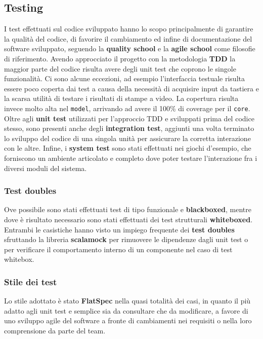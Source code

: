 \subsection{Testing}
I test effettuati sul codice sviluppato hanno lo scopo principalmente di garantire la qualità del codice, di favorire il cambiamento ed infine di documentazione del software sviluppato, seguendo la \textbf{quality school} e la \textbf{agile school} come filosofie di riferimento.
%
Avendo approcciato il progetto con la metodologia \textbf{TDD} la maggior parte del codice risulta avere degli unit test che coprono le singole funzionalità.
%
Ci sono alcune eccezioni, ad esempio l'interfaccia testuale risulta essere poco coperta dai test a causa della necessità di acquisire input da tastiera e la scarsa utilità di testare i risultati di stampe a video.
%
La copertura risulta invece molto alta nel \texttt{model}, arrivando ad avere il 100\% di coverage per il \texttt{core}.
%
Oltre agli \textbf{unit test} utilizzati per l'approccio TDD e sviluppati prima del codice stesso, sono presenti anche degli \textbf{integration test}, aggiunti una volta terminato lo sviluppo del codice di una singola unità per assicurare la corretta interazione con le altre.
%
Infine, i \textbf{system test} sono stati effettuati nei giochi d'esempio, che forniscono un ambiente articolato e completo dove poter testare l'interazione fra i diversi moduli del sistema.
%

\subsubsection{Test doubles}
Ove possibile sono stati effettuati test di tipo funzionale e \textbf{blackboxed}, mentre dove è risultato necessario sono stati effettuati dei test strutturali \textbf{whiteboxed}.
%
Entrambi le casistiche hanno visto un impiego frequente dei \textbf{test doubles} sfruttando la libreria \textbf{scalamock} per rimuovere le dipendenze dagli unit test o per verificare il comportamento interno di un componente nel caso di test whitebox.

\subsubsection{Stile dei test}
Lo stile adottato è stato \textbf{FlatSpec} nella quasi totalità dei casi, in quanto il più adatto agli unit test e semplice sia da consultare che da modificare, a favore di uno sviluppo agile del software a fronte di cambiamenti nei requisiti o nella loro comprensione da parte del team.